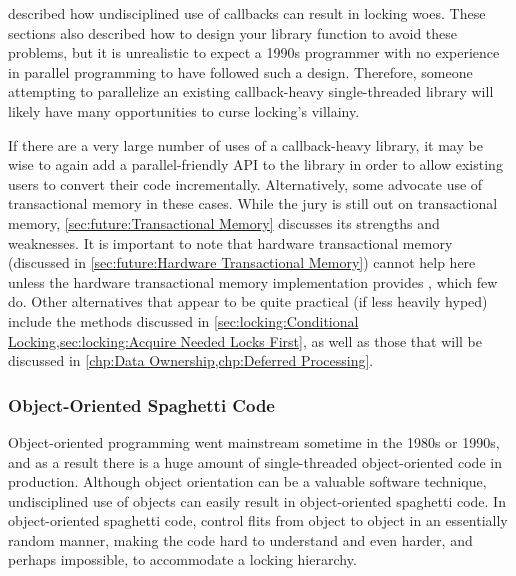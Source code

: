 described how undisciplined use of callbacks can result in locking
woes.
These sections also described how to design your library function to
avoid these problems, but it is unrealistic to expect a 1990s programmer
with no experience in parallel programming to have followed such a design.
Therefore, someone attempting to parallelize an existing callback-heavy
single-threaded library will likely have many opportunities to curse
locking's villainy.

If there are a very large number of uses of a callback-heavy library,
it may be wise to again add a parallel-friendly API to the library in
order to allow existing users to convert their code incrementally.
Alternatively, some advocate use of transactional memory in these cases.
While the jury is still out on transactional memory,
\cref{sec:future:Transactional Memory} discusses its strengths and
weaknesses.
It is important to note that hardware transactional memory
(discussed in
\cref{sec:future:Hardware Transactional Memory})
cannot help here unless the hardware transactional memory implementation
provides , which few do.
Other alternatives that appear to be quite practical (if less heavily
hyped) include the methods discussed in
\cref{sec:locking:Conditional Locking,sec:locking:Acquire Needed Locks First},
as well as those that will be discussed in
\cref{chp:Data Ownership,chp:Deferred Processing}.

\subsubsection{Object-Oriented Spaghetti Code}
\label{sec:locking:Object-Oriented Spaghetti Code}

Object-oriented programming went mainstream sometime in the 1980s or
1990s, and as a result there is a huge amount of single-threaded
object-oriented code in production.
Although object orientation can be a valuable software technique,
undisciplined use of objects can easily result in object-oriented
spaghetti code.
In object-oriented spaghetti code, control flits from object to object
in an essentially random manner, making the code hard to understand
and even harder, and perhaps impossible, to accommodate a locking hierarchy.

